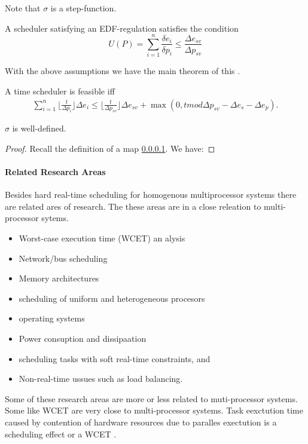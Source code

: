\begin{remark}
Note that $\sigma$ is a step-function. 
\end{remark}


\begin{remark} A scheduler satisfying an EDF-regulation satisfies the condition
	\begin{equation}
	U(P) = \sum\limits_{i=1}^n \frac{\delta e_i}{\delta p_i} \leq 		\frac{\Delta e_{sv}}{\Delta p_{sv}}
	\end{equation}
\end{remark}

With the above assumptions we have the main theorem of this \cite{K}.
\begin{theorem}
A time scheduler is feasible iff 
	\begin{align}
	\sum_{i=1}^n \lfloor \frac{t}{\Delta p_i} \rfloor \Delta e_i \leq \lfloor  \frac{t}{\Delta p_{sv}} \rfloor \Delta e_{sv} + \max (0,t  mod \Delta p_{sv} -\Delta e_{s} -\Delta e_p).
	\end{align}
\end{theorem}

\begin{lemma}
 $\sigma$ is well-defined.
\end{lemma}
\begin{proof}
Recall the definition of a map \ref{}. We have:
\end{proof}

\paragraph{Related Research Areas}
Besides hard real-time scheduling for homogenous multiprocessor systems there are related ares of research. The these areas are in a  close releation to multi-processor sytems.
\begin{itemize}
\item Worst-case execution time (WCET) an alysis
\item Network/bus scheduling
\item Memory architectures
\item scheduling of uniform and heterogeneous procesors
\item operating systems
\item Power consuption and dissipaation
\item scheduling tasks with soft real-time constraints, and
\item Non-real-time ussues such as load balancing.
\end{itemize}
Some of these research areas are more or less related to muti-processor systems. Some like WCET are very close to multi-processor systems.
Task eexctution time caused by contention of hardware resources due to paralles exectution is a scheduling effect or a WCET \cite[Sec. 10.2]{DB2011}.
 
